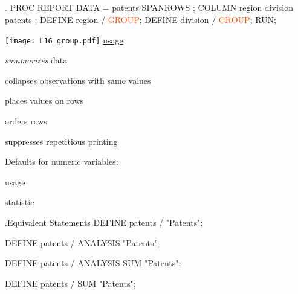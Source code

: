 \subsection{}
\begin{frame}
\end{frame}

\begin{frame}[fragile]
\begin{code}{.}
PROC REPORT DATA = patents SPANROWS ;
   COLUMN region division patents  ;
   DEFINE region / \textcolor{OrangeRed}{GROUP};
   DEFINE division / \textcolor{OrangeRed}{GROUP};
RUN;
\end{code}
\emp
\blankcolumn
{}
\texttt{[image: L16\_group.pdf]}
\emp
\vskip10pt
\underline{ usage}
\bi
\item \emph{summarizes} data
\item collapses observations with same values
\item places values on rows
\item orders rows
\item suppresses repetitious printing
\ei
\end{frame}

\begin{frame}[fragile]
Defaults for numeric variables:
\bi
\item {} usage
\item {} statistic
\item[]
\ei
{}
\begin{craw}{.}{Equivalent Statements}
DEFINE patents / "Patents";

DEFINE patents / ANALYSIS "Patents";

DEFINE patents / ANALYSIS SUM "Patents";

DEFINE patents / SUM "Patents";
\end{craw}
\emp
\end{frame}

\begin{frame}
\begin{center}
\end{center}
\end{frame}


